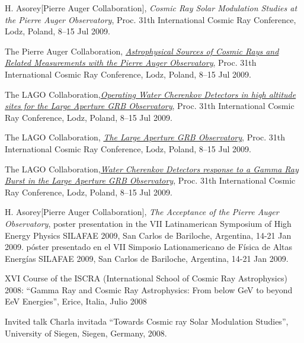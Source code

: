\begin{etaremune}
\item {}H. Asorey[Pierre Auger Collaboration], {\emph{Cosmic Ray Solar
Modulation Studies at the Pierre Auger Observatory}}, \en Proc. 31th
International Cosmic Ray Conference, Lodz, Poland, 8--15 Jul 2009.

\item {}The Pierre Auger Collaboration,
\href{http://arxiv.org/abs/0906.2347}{\emph{Astrophysical Sources of Cosmic
Rays and Related Measurements with the Pierre Auger Observatory}}, \en Proc.
31th International Cosmic Ray Conference, Lodz, Poland, 8--15 Jul 2009.

\item {}The LAGO Collaboration,\href{http://arxiv.org/abs/0906.0814}{\emph{Operating Water Cherenkov Detectors in high altitude sites for the Large Aperture GRB Observatory}}, \en Proc. 31th International Cosmic Ray Conference, Lodz, Poland, 8--15 Jul 2009.

\item {}The LAGO Collaboration,
\href{http://arxiv.org/abs/0906.0816}{\emph{The Large Aperture GRB
Observatory}}, \en Proc. 31th International Cosmic Ray Conference, Lodz,
Poland, 8--15 Jul 2009.

\item {}The LAGO Collaboration,\href{http://arxiv.org/abs/0906.0820}{\emph{Water Cherenkov Detectors response to a Gamma Ray Burst in the Large Aperture GRB Observatory}}, \en Proc. 31th International Cosmic Ray Conference, Lodz, Poland, 8--15 Jul 2009.
\item {}H. Asorey[Pierre Auger Collaboration], {\emph{The Acceptance of the
Pierre Auger Observatory}}, 
\ifeng
poster presentation in the VII Latinamerican Symposium of High Energy Physics SILAFAE 2009, San Carlos de Bariloche, Argentina, 14-21 Jan 2009.
\else
póster presentado en el VII Simposio Lationamericano de Física de Altas Energías SILAFAE 2009, San Carlos de Bariloche, Argentina, 14-21 Jan 2009.
\fi

\item {}XVI Course of the ISCRA (International School of Cosmic Ray Astrophysics) 2008: ``Gamma Ray and Cosmic Ray Astrophysics: From below GeV to beyond EeV Energies'', Erice, Italia, Julio 2008

\item {}\ifeng Invited talk \else Charla invitada \fi ``Towards Cosmic ray Solar Modulation Studies'', University of Siegen, Siegen, Germany, 2008.


\end{etaremune}
